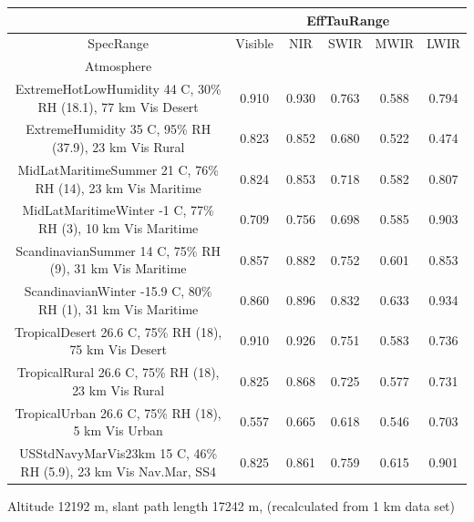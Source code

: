 \documentclass{workpackage}
\begin{document}
\begin{center}

\begin{footnotesize}

\begin{tabular}{|c|c|c|c|c|c|}
\hline
&\multicolumn{5}{|c|}{EffTauRange}\\\hline
SpecRange&Visible&NIR&SWIR&MWIR&LWIR\\\hline
Atmosphere&&&&&\\\hline
ExtremeHotLowHumidity 44 C, 30\% RH (18.1), 77 km Vis Desert&0.910&0.930&0.763&0.588&0.794\\\hline
ExtremeHumidity 35 C, 95\% RH (37.9), 23 km Vis Rural&0.823&0.852&0.680&0.522&0.474\\\hline
MidLatMaritimeSummer 21 C, 76\% RH (14), 23 km Vis Maritime&0.824&0.853&0.718&0.582&0.807\\\hline
MidLatMaritimeWinter -1 C, 77\% RH (3), 10 km Vis Maritime&0.709&0.756&0.698&0.585&0.903\\\hline
ScandinavianSummer 14 C, 75\% RH (9), 31 km Vis Maritime&0.857&0.882&0.752&0.601&0.853\\\hline
ScandinavianWinter -15.9 C, 80\% RH (1), 31 km Vis Maritime&0.860&0.896&0.832&0.633&0.934\\\hline
TropicalDesert 26.6 C, 75\% RH (18), 75 km Vis Desert&0.910&0.926&0.751&0.583&0.736\\\hline
TropicalRural 26.6 C, 75\% RH (18), 23 km Vis Rural&0.825&0.868&0.725&0.577&0.731\\\hline
TropicalUrban 26.6 C, 75\% RH (18), 5 km Vis Urban&0.557&0.665&0.618&0.546&0.703\\\hline
USStdNavyMarVis23km 15 C, 46\% RH (5.9), 23 km Vis Nav.Mar, SS4&0.825&0.861&0.759&0.615&0.901\\\hline

\end{tabular}
\end{footnotesize}
\end{center}


Altitude 12192 m, slant path length 17242 m, (recalculated from 1 km data set)
\end{document}
